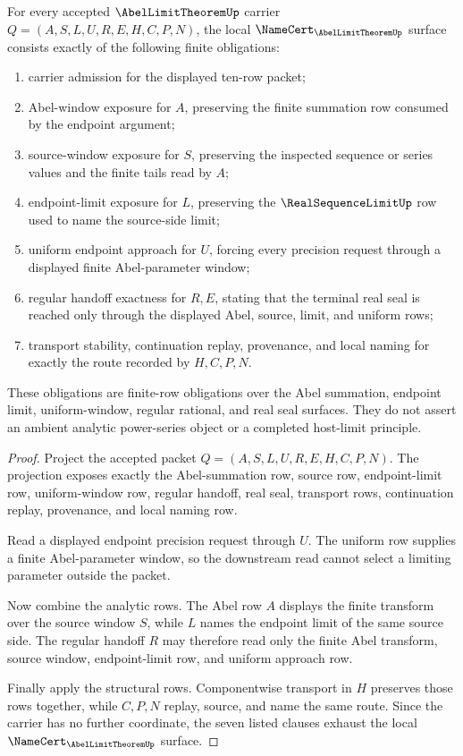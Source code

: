 \begin{theorem}
\label{thm:abel-limit-theorem-namecert-obligations}
For every accepted $\AbelLimitTheoremUp$ carrier $Q=(A,S,L,U,R,E,H,C,P,N)$, the local $\NameCert_{\AbelLimitTheoremUp}$ surface consists exactly of the following finite obligations:
\begin{enumerate}
\item carrier admission for the displayed ten-row packet;
\item Abel-window exposure for $A$, preserving the finite summation row consumed by the endpoint argument;
\item source-window exposure for $S$, preserving the inspected sequence or series values and the finite tails read by $A$;
\item endpoint-limit exposure for $L$, preserving the $\RealSequenceLimitUp$ row used to name the source-side limit;
\item uniform endpoint approach for $U$, forcing every precision request through a displayed finite Abel-parameter window;
\item regular handoff exactness for $R,E$, stating that the terminal real seal is reached only through the displayed Abel, source, limit, and uniform rows;
\item transport stability, continuation replay, provenance, and local naming for exactly the route recorded by $H,C,P,N$.
\end{enumerate}
These obligations are finite-row obligations over the Abel summation, endpoint limit, uniform-window, regular rational, and real seal surfaces. They do not assert an ambient analytic power-series object or a completed host-limit principle.
\end{theorem}
\begin{proof}
Project the accepted packet $Q=(A,S,L,U,R,E,H,C,P,N)$. The projection exposes exactly the Abel-summation row, source row, endpoint-limit row, uniform-window row, regular handoff, real seal, transport rows, continuation replay, provenance, and local naming row.

Read a displayed endpoint precision request through $U$. The uniform row supplies a finite Abel-parameter window, so the downstream read cannot select a limiting parameter outside the packet.

Now combine the analytic rows. The Abel row $A$ displays the finite transform over the source window $S$, while $L$ names the endpoint limit of the same source side. The regular handoff $R$ may therefore read only the finite Abel transform, source window, endpoint-limit row, and uniform approach row.

Finally apply the structural rows. Componentwise transport in $H$ preserves those rows together, while $C,P,N$ replay, source, and name the same route. Since the carrier has no further coordinate, the seven listed clauses exhaust the local $\NameCert_{\AbelLimitTheoremUp}$ surface.
\end{proof}

